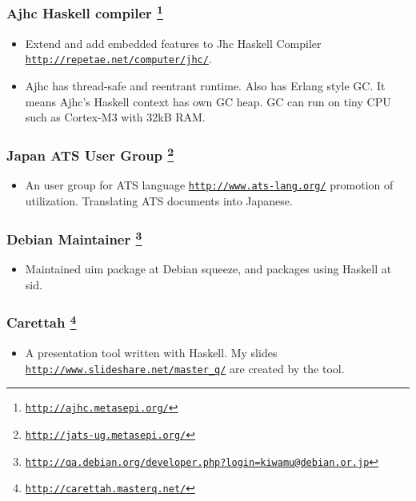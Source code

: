 \documentclass[letterpaper]{article}
\begin{document}
\subsubsection*{Ajhc Haskell compiler \footnote{\href{http://ajhc.metasepi.org/}{\tt http://ajhc.metasepi.org/}}}
\begin{itemize}
\item Extend and add embedded features to Jhc Haskell Compiler \href{http://repetae.net/computer/jhc/}{\tt http://repetae.net/computer/jhc/}.
\item Ajhc has thread-safe and reentrant runtime. Also has Erlang style GC. It means Ajhc's Haskell context has own GC heap. GC can run on tiny CPU such as Cortex-M3 with 32kB RAM.
\end{itemize}

\subsubsection*{Japan ATS User Group \footnote{\href{http://jats-ug.metasepi.org/}{\tt http://jats-ug.metasepi.org/}}}
\begin{itemize}
\item An user group for ATS language \href{http://www.ats-lang.org/}{\tt http://www.ats-lang.org/} promotion of utilization. Translating ATS documents into Japanese.
\end{itemize}

\subsubsection*{Debian Maintainer \footnote{\href{http://qa.debian.org/developer.php?login=kiwamu@debian.or.jp}{\tt http://qa.debian.org/developer.php?login=kiwamu@debian.or.jp}}}
\begin{itemize}
\item Maintained uim package at Debian squeeze, and packages using Haskell at sid.
\end{itemize}

\subsubsection*{Carettah \footnote{\href{http://carettah.masterq.net/}{\tt http://carettah.masterq.net/}}}
\begin{itemize}
\item A presentation tool written with Haskell. My slides \href{http://www.slideshare.net/master\_q/}{\tt http://www.slideshare.net/master\_q/} are created by the tool.
\end{itemize}
\end{document}
